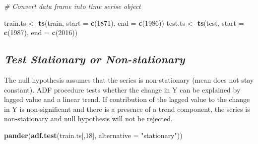 \documentclass[12pt,openany]{book}
\newenvironment{Shaded}{\begin{snugshade}}{\end{snugshade}}
\newcommand{\CommentTok}[1]{\textcolor[rgb]{0.56,0.35,0.01}{\textit{#1}}}
\newcommand{\DataTypeTok}[1]{\textcolor[rgb]{0.13,0.29,0.53}{#1}}
\newcommand{\DecValTok}[1]{\textcolor[rgb]{0.00,0.00,0.81}{#1}}
\newcommand{\KeywordTok}[1]{\textcolor[rgb]{0.13,0.29,0.53}{\textbf{#1}}}
\newcommand{\NormalTok}[1]{#1}
\newcommand{\StringTok}[1]{\textcolor[rgb]{0.31,0.60,0.02}{#1}}
\begin{document}
\begin{Shaded}
\begin{Highlighting}[]
\CommentTok{# Convert data frame into time serise object}

\NormalTok{train.ts <-}\StringTok{ }\KeywordTok{ts}\NormalTok{(train, }\DataTypeTok{start =} \KeywordTok{c}\NormalTok{(}\DecValTok{1871}\NormalTok{), }\DataTypeTok{end =} \KeywordTok{c}\NormalTok{(}\DecValTok{1986}\NormalTok{))}
\NormalTok{test.ts <-}\StringTok{ }\KeywordTok{ts}\NormalTok{(test, }\DataTypeTok{start =} \KeywordTok{c}\NormalTok{(}\DecValTok{1987}\NormalTok{), }\DataTypeTok{end =} \KeywordTok{c}\NormalTok{(}\DecValTok{2016}\NormalTok{))}
\end{Highlighting}
\end{Shaded}

\hypertarget{test-stationary-or-non-stationary}{%
\subsection{\texorpdfstring{\textbf{\emph{Test Stationary or Non-stationary}}}{Test Stationary or Non-stationary}}\label{test-stationary-or-non-stationary}}

The null hypothesis assumes that the series is non-stationary (mean does not stay constant). ADF procedure tests whether the change in Y can be explained by lagged value and a linear trend. If contribution of the lagged value to the change in Y is non-significant and there is a presence of a trend component, the series is non-stationary and null hypothesis will not be rejected.

\begin{Shaded}
\begin{Highlighting}[]
\KeywordTok{pander}\NormalTok{(}\KeywordTok{adf.test}\NormalTok{(train.ts[,}\DecValTok{18}\NormalTok{], }\DataTypeTok{alternative =} \StringTok{"stationary"}\NormalTok{))}
\end{Highlighting}
\end{Shaded}
\end{document}
